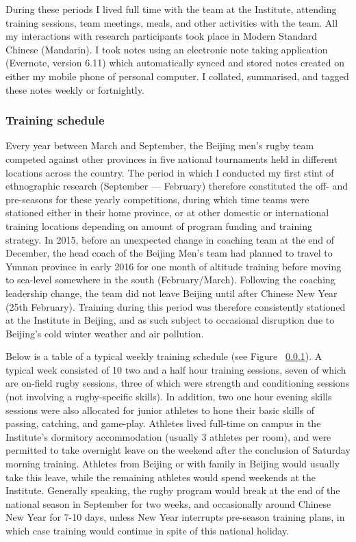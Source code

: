 During these periods I lived full time with the team at the Institute, attending training sessions, team meetings, meals, and other activities with the team.   All my interactions with research participants took place in Modern Standard Chinese (Mandarin).  I took notes using an electronic note taking application (Evernote, version 6.11) which automatically synced and stored notes created on either my mobile phone of personal computer. I collated, summarised, and tagged these notes weekly or fortnightly.





\subsubsection{Training schedule}

  Every year between March and September, the Beijing men's rugby team competed against other provinces in five national tournaments held in different locations across the country. The period in which I conducted my first stint of ethnographic research (September –-- February) therefore constituted the off- and pre-seasons for these yearly competitions, during which time teams were stationed either in their home province, or at other domestic or international training locations depending on amount of program funding and training strategy.  In 2015, before an unexpected change in coaching team at the end of December, the head coach of the Beijing Men's team had planned to travel to Yunnan province in early 2016 for one month of altitude training before moving to sea-level somewhere in the south (February/March).  Following the coaching leadership change, the team did not leave Beijing until after Chinese New Year (25th February). Training during this period was therefore consistently stationed at the Institute in Beijing, and as such subject to occasional disruption due to Beijing's cold winter weather and air pollution.

  Below is a table of a typical weekly training schedule (see Figure ~\ref{}). A typical week consisted of 10 two and a half hour training sessions, seven of which are on-field rugby sessions, three of which were strength and conditioning sessions (not involving a rugby-specific skills).  In addition, two one hour evening skills sessions were also allocated for junior athletes to hone their basic skills of passing, catching, and game-play.  Athletes lived full-time on campus in the Institute's dormitory accommodation (usually 3 athletes per room), and were permitted to take overnight leave on the weekend after the conclusion of Saturday morning training.  Athletes from Beijing or with family in Beijing would usually take this leave, while the remaining athletes would spend weekends at the Institute.  Generally speaking, the rugby program would break at the end of the national season in September for two weeks, and occasionally around Chinese New Year for 7-10 days, unless New Year interrupts pre-season training plans, in which case training would continue in spite of this national holiday.

